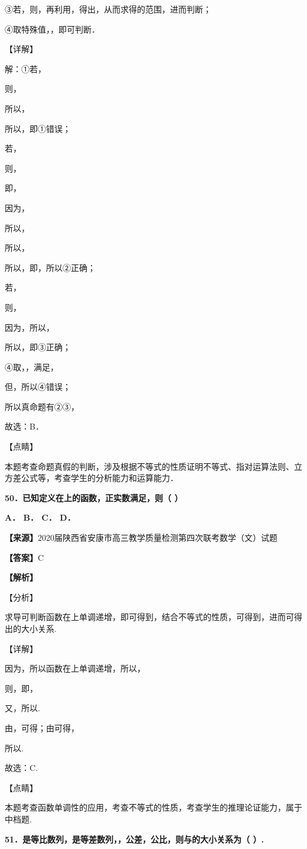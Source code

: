 \documentclass[
]{article}
\begin{document}
③若，则，再利用，得出，从而求得的范围，进而判断；

④取特殊值，，即可判断．

【详解】

解：①若，

则，

所以，

所以，即①错误；

若，

则，

即，

因为，

所以，

所以，

所以，即，所以②正确；

若，

则，

因为，所以，

所以，即③正确；

④取，，满足，

但，所以④错误；

所以真命题有②③，

故选：B．

【点睛】

本题考查命题真假的判断，涉及根据不等式的性质证明不等式、指对运算法则、立方差公式等，考查学生的分析能力和运算能力．

\textbf{50．已知定义在上的函数，正实数满足，则（ ）}

\textbf{A． B． C． D．}

\textbf{【来源】}2020届陕西省安康市高三教学质量检测第四次联考数学（文）试题

\textbf{【答案】}C

\textbf{【解析】}

【分析】

求导可判断函数在上单调递增，即可得到，结合不等式的性质，可得到，进而可得出的大小关系.

【详解】

因为，所以函数在上单调递增，所以，

则，即，

又，所以.

由，可得；由可得，

所以.

故选：C.

【点睛】

本题考查函数单调性的应用，考查不等式的性质，考查学生的推理论证能力，属于中档题.

\textbf{51．是等比数列，是等差数列，，公差，公比，则与的大小关系为（
）.}
\end{document}
